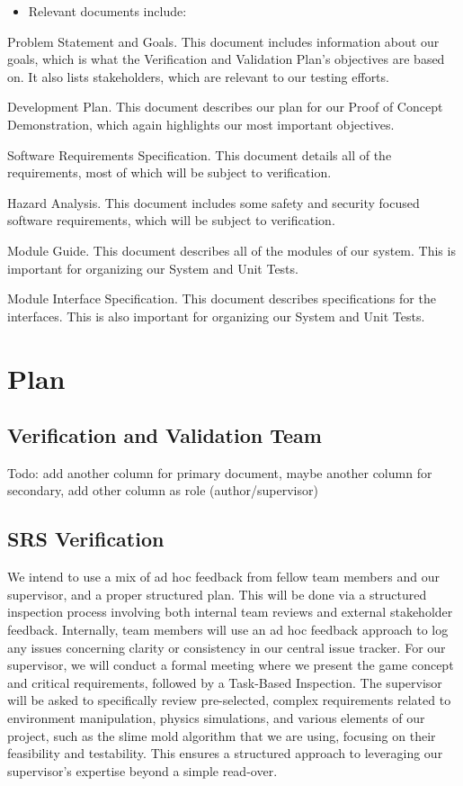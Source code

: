 \documentclass[12pt, titlepage]{article}
\begin{document}
\begin{itemize}
  \item Relevant documents include:
\end{itemize}

Problem Statement and Goals. This document includes information about our goals, which is what the Verification and Validation Plan’s objectives are based on. It also lists stakeholders, which are relevant to our testing efforts.

Development Plan. This document describes our plan for our Proof of Concept Demonstration, which again highlights our most important objectives.

Software Requirements Specification. This document details all of the requirements, most of which will be subject to verification.

Hazard Analysis. This document includes some safety and security focused software requirements, which will be subject to verification.

Module Guide. This document describes all of the modules of our system. This is important for organizing our System and Unit Tests.

Module Interface Specification. This document describes specifications for the interfaces. This is also important for organizing our System and Unit Tests.

\section{Plan}

\subsection{Verification and Validation Team}

Todo: add another column for primary document, maybe another column for secondary, add other column as role (author/supervisor)

\subsection{SRS Verification}

We intend to use a mix of ad hoc feedback from fellow team members and our supervisor, and a proper structured plan. This will be done via a structured inspection process involving both internal team reviews and external stakeholder feedback. Internally, team members will use an ad hoc feedback approach to log any issues concerning clarity or consistency in our central issue tracker. For our supervisor, we will conduct a formal meeting where we present the game concept and critical requirements, followed by a Task-Based Inspection. The supervisor will be asked to specifically review pre-selected, complex requirements related to environment manipulation, physics simulations, and various elements of our project, such as the slime mold algorithm that we are using, focusing on their feasibility and testability. This ensures a structured approach to leveraging our supervisor's expertise beyond a simple read-over.
\end{document}
